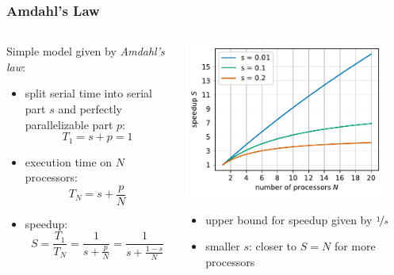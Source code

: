 \documentclass[aspectratio=169]{beamer}
\begin{document}
\begin{frame}
	\frametitle{Amdahl's Law}
	
	\begin{columns}
		\begin{column}{0.48\textwidth}
			Simple model given by \emph{Amdahl's law}:
			\begin{itemize}
				\item split serial time into serial part \(s\) and perfectly parallelizable part \(p\): 
				\begin{equation}
					T_1 = s + p = 1
				\end{equation}	
				\item execution time on \(N\) processors: 
				\begin{equation}
					T_N = s + \frac{p}{N}
				\end{equation}
				\item speedup: 
				\begin{equation}
					S = \frac{T_1}{T_N} = \frac{1}{s + \frac{p}{N}} = \frac{1}{s + \frac{1 - s}{N}}
				\end{equation}
			\end{itemize}
		\end{column}

		\begin{column}{0.48\textwidth}
			\includegraphics[width=0.9\textwidth]{figs/amdahl.pdf}
			\begin{itemize}
				\item upper bound for speedup given by \(\nicefrac{1}{s}\)
				\item smaller \(s\): closer to \(S = N\) for more processors
			\end{itemize}
			
		\end{column}
	\end{columns}
\end{frame}
\end{document}

